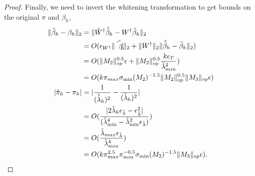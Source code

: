 \begin{proof}
Finally, we need to invert the whitening transformation to get bounds on
the original $\pi$ and $\beta_h$,
\begin{align*}
  \|\hat \beta_h - \beta_h\|_2
  &= \| \hat W^{\dagger} \hat {\tilde \beta}_h - W^{\dagger} {\tilde \beta}_h \|_2 \\
  &= O( \epsilon_{W^{\dagger}} \|\hat{\tilde \beta_h}\|_2 + \|W^{\dagger}\|_2 \|\hat {\tilde \beta}_h - {\tilde \beta}_h\|_2 )\\
  &= O(\|M_2\|_{op}^{0.5} \epsilon + \|M_2\|_{op}^{0.5} \frac{k \epsilon_{T}}{\tilde \lambda_{min}^2}) \\
  &= O( k \pi_{max} \sigma_\text{\rm min}(M_2)^{-1.5} \|M_2\|_{op}^{0.5} \|M_3\|_{op} \epsilon ) \\
  |\hat \pi_h - \pi_h |
  &= |\frac{1}{(\hat{\tilde{\lambda}}_h)^2} - \frac{1}{({\tilde{\lambda}}_h)^2}| \\
  &= O( \frac{|2 {\tilde \lambda}_h \epsilon_{\tilde{\lambda}} - \epsilon_{\tilde{\lambda}}^2 |}{({\tilde \lambda}_{\min}^4 - {\tilde \lambda}_{\min}^2 \epsilon_{\tilde \lambda})} ) \\
  &= O( \frac{{\tilde \lambda}_{max} \epsilon_{\tilde \lambda}}{{\tilde\lambda}_{min}^4} ) \\
  &= O( k \pi_{max}^{2.5} \pi_{min}^{-0.5} \sigma_\text{\rm min}(M_2)^{-1.5} \|M_3\|_{op} \epsilon ).
\end{align*}

\end{proof}



